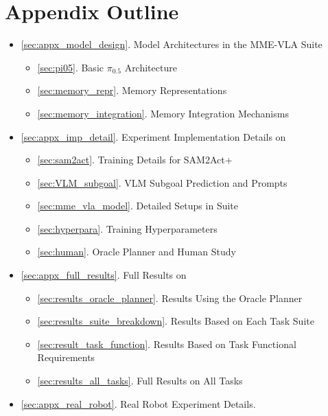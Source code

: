 \clearpage
\setcounter{page}{1}
\maketitlesupplementary

\appendix

\section*{Appendix Outline}
\begin{itemize}

\item \ref{sec:appx_model_design}. Model Architectures in the MME-VLA Suite
    \begin{itemize}
      \item \ref{sec:pi05}. Basic $\pi_{0.5}$ Architecture
      \item \ref{sec:memory_repr}. Memory Representations
      \item \ref{sec:memory_integration}. Memory Integration Mechanisms
    \end{itemize}

\item \ref{sec:appx_imp_detail}. Experiment Implementation Details on \benchname
    \begin{itemize}
        \item \ref{sec:sam2act}. Training Details for SAM2Act+
        \item \ref{sec:VLM_subgoal}. VLM Subgoal Prediction and Prompts
        \item \ref{sec:mme_vla_model}. Detailed Setups in \modelname\xspace Suite
        \item \ref{sec:hyperpara}. Training Hyperparameters
        \item \ref{sec:human}. Oracle Planner and Human Study
    \end{itemize}
\item \ref{sec:appx_full_results}. Full Results on \benchname
    \begin{itemize}
        \item \ref{sec:results_oracle_planner}. Results Using the Oracle Planner
        \item \ref{sec:results_suite_breakdown}. Results Based on Each Task Suite
        \item \ref{sec:result_task_function}. Results Based on Task Functional Requirements
        \item \ref{sec:results_all_tasks}. Full Results on All Tasks
    \end{itemize}
\item \ref{sec:appx_real_robot}. Real Robot Experiment Details.


\end{itemize}
